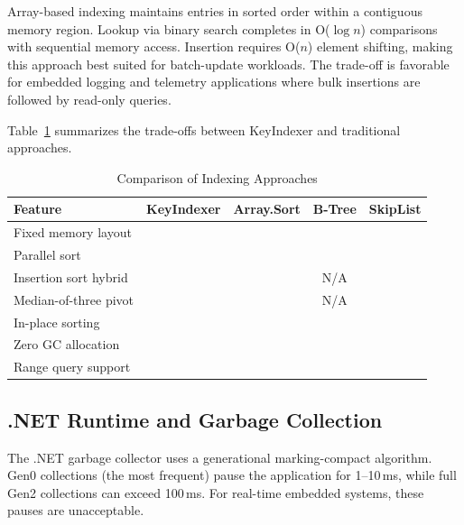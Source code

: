 \documentclass[conference]{IEEEtran}
\newcommand{\cmark}{\ding{51}}
\newcommand{\xmark}{\ding{55}}
\begin{document}
Array-based indexing maintains entries in sorted order within a contiguous memory region. Lookup via binary search completes in O($\log n$) comparisons with sequential memory access. Insertion requires O($n$) element shifting, making this approach best suited for batch-update workloads. The trade-off is favorable for embedded logging and telemetry applications where bulk insertions are followed by read-only queries.

Table~\ref{tab:comparison} summarizes the trade-offs between KeyIndexer and traditional approaches.

\begin{table}[htbp]
    \caption{Comparison of Indexing Approaches}
    \label{tab:comparison}
    \centering
    \begin{tabular}{lcccc}
        \toprule
        \textbf{Feature} & \textbf{KeyIndexer} & \textbf{Array.Sort} & \textbf{B-Tree} & \textbf{SkipList} \\
        \midrule
        Fixed memory layout & \cmark & \xmark & \xmark & \xmark \\
        Parallel sort & \cmark & \xmark & \xmark & \xmark \\
        Insertion sort hybrid & \cmark & \cmark & N/A & \xmark \\
        Median-of-three pivot & \cmark & \cmark & N/A & \xmark \\
        In-place sorting & \cmark & \cmark & \xmark & \xmark \\
        Zero GC allocation & \cmark & \xmark & \xmark & \xmark \\
        Range query support & \cmark & \cmark & \cmark & \cmark \\
        \bottomrule
    \end{tabular}
\end{table}

\subsection{.NET Runtime and Garbage Collection}
\label{sec:dotnet_gc}

The .NET garbage collector uses a generational marking-compact algorithm. Gen0 collections (the most frequent) pause the application for 1--10\,ms, while full Gen2 collections can exceed 100\,ms. For real-time embedded systems, these pauses are unacceptable.
\end{document}

